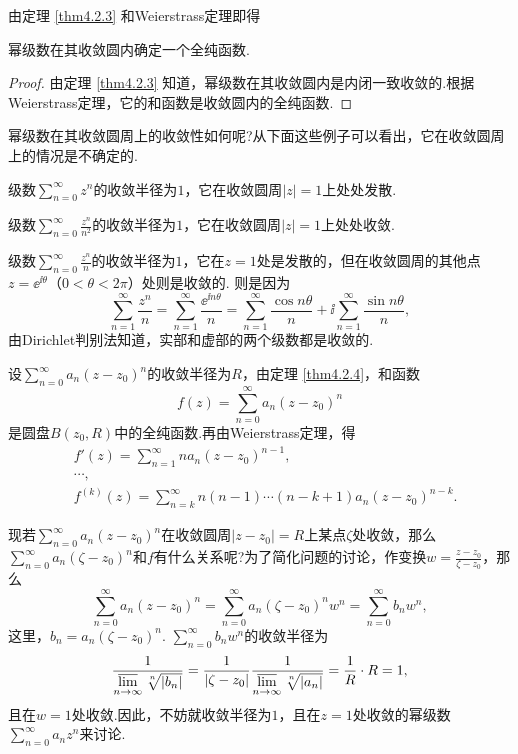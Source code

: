 由定理 \ref{thm4.2.3} 和Weierstrass定理即得
\begin{theorem}\label{thm4.2.4}
  幂级数在其收敛圆内确定一个全纯函数.
\end{theorem}
\begin{proof}
  由定理 \ref{thm4.2.3} 知道，幂级数在其收敛圆内是内闭一致收敛的.根据Weierstrass定理，它的和函数是收敛圆内的全纯函数.
\end{proof}

幂级数在其收敛圆周上的收敛性如何呢?从下面这些例子可以看出，它在收敛圆周上的情况是不确定的.

\begin{example}\label{exam4.2.5}
  级数$\sum_{n=0}^\infty z^n$的收敛半径为$1$，它在收敛圆周$|z|=1$上处处发散.
\end{example}
\begin{example}\label{exam4.2.6}
  级数$\sum_{n=0}^\infty \frac{z^n}{n^2}$的收敛半径为$1$，它在收敛圆周$|z|=1$上处处收敛.
\end{example}
\begin{example}
  级数$\sum_{n=0}^\infty \frac{z^n}{n}$的收敛半径为$1$，它在$z=1$处是发散的，但在收敛圆周的其他点$z=\ee^{\ii\theta}$（$0<\theta<2\pi$）处则是收敛的. 则是因为
  \[
    \sum_{n=1}^\infty\frac{z^n}n = \sum_{n=1}^\infty \frac{\ee^{\ii n\theta}}n = \sum_{n=1}^\infty\frac{\cos n\theta}n + \ii\sum_{n=1}^\infty\frac{\sin n\theta}n,
  \]
  由Dirichlet判别法知道，实部和虚部的两个级数都是收敛的.
\end{example}

设$\sum_{n=0}^\infty a_n(z-z_0)^n$的收敛半径为$R$，由定理 \ref{thm4.2.4}，和函数
\[
  f(z) = \sum_{n=0}^\infty a_n(z-z_0)^n
\]
是圆盘$B(z_0,R)$中的全纯函数.再由Weierstrass定理，得
\begin{align*}
  & f'(z) = \sum_{n=1}^\infty na_n(z-z_0)^{n-1},\\
  & \cdots,\\
  & f^{(k)}(z) = \sum_{n=k}^\infty n(n-1)\cdots(n-k+1)a_n(z-z_0)^{n-k}.
\end{align*}

现若$\sum_{n=0}^\infty a_n(z-z_0)^n$在收敛圆周$|z-z_0|=R$上某点$\zeta$处收敛，那么$\sum_{n=0}^\infty a_n(\zeta-z_0)^n$和$f$有什么关系呢?为了简化问题的讨论，作变换$w=\frac{z-z_0}{\zeta-z_0}$，那么
\[
  \sum_{n=0}^\infty a_n(z-z_0)^n = \sum_{n=0}^\infty a_n(\zeta-z_0)^nw^n = \sum_{n=0}^\infty b_nw^n,
\]
这里，$b_n=a_n(\zeta-z_0)^n$. $\sum_{n=0}^\infty b_nw^n$的收敛半径为
\[
  \frac1{\varlimsup\limits_{n\to\infty}\sqrt[\leftroot{-1}\uproot{2}n]{|b_n|}}
  =\frac1{|\zeta-z_0|}\frac1{\varlimsup\limits_{n\to\infty}\sqrt[\leftroot{-1}
  \uproot{2}n]{|a_n|}}=\frac1R\cdot R=1,
\]
且在$w=1$处收敛.因此，不妨就收敛半径为$1$，且在$z=1$处收敛的幂级数$\sum_{n=0}^\infty a_nz^n$来讨论.

